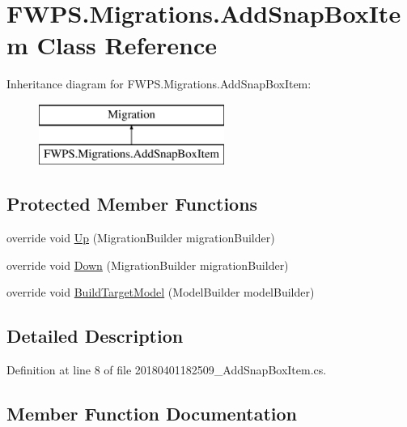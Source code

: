 \hypertarget{class_f_w_p_s_1_1_migrations_1_1_add_snap_box_item}{}\section{F\+W\+P\+S.\+Migrations.\+Add\+Snap\+Box\+Item Class Reference}
\label{class_f_w_p_s_1_1_migrations_1_1_add_snap_box_item}
Inheritance diagram for F\+W\+P\+S.\+Migrations.\+Add\+Snap\+Box\+Item\+:\begin{figure}[H]
\begin{center}
\leavevmode
\includegraphics[height=2.000000cm]{class_f_w_p_s_1_1_migrations_1_1_add_snap_box_item}
\end{center}
\end{figure}
\subsection*{Protected Member Functions}
\begin{DoxyCompactItemize}
\item 
override void \mbox{\hyperlink{class_f_w_p_s_1_1_migrations_1_1_add_snap_box_item_a1803590671da458cf29631e5496dc143}{Up}} (Migration\+Builder migration\+Builder)
\item 
override void \mbox{\hyperlink{class_f_w_p_s_1_1_migrations_1_1_add_snap_box_item_af8e8ffea8a734c62158a56b2ee04203e}{Down}} (Migration\+Builder migration\+Builder)
\item 
override void \mbox{\hyperlink{class_f_w_p_s_1_1_migrations_1_1_add_snap_box_item_a68c1ed026237fd65346d351982b56d88}{Build\+Target\+Model}} (Model\+Builder model\+Builder)
\end{DoxyCompactItemize}


\subsection{Detailed Description}


Definition at line 8 of file 20180401182509\+\_\+\+Add\+Snap\+Box\+Item.\+cs.



\subsection{Member Function Documentation}
\mbox{\label{class_f_w_p_s_1_1_migrations_1_1_add_snap_box_item_a68c1ed026237fd65346d351982b56d88}} 
